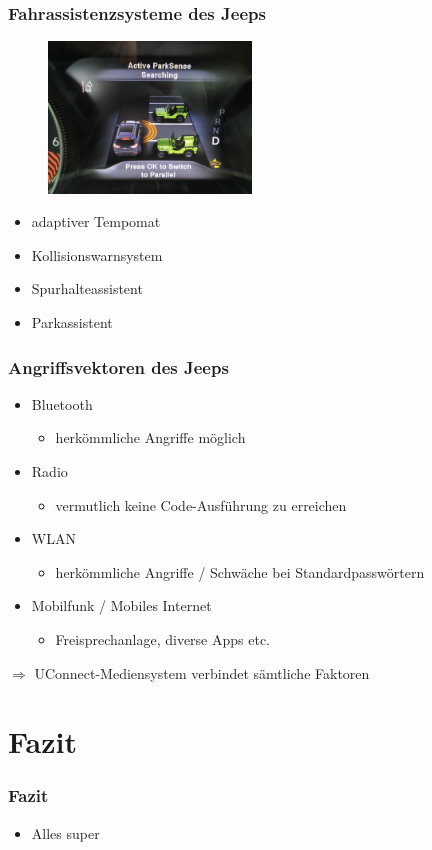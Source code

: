 \documentclass[t]{beamer}
\begin{document}
\begin{frame}
    \frametitle{Fahrassistenzsysteme des Jeeps}
    \begin{figure}
        \includegraphics[width=0.48\textwidth]{pic/jeep_parkass.png}
        \caption{}
    \end{figure}
    \begin{itemize}
        \item adaptiver Tempomat
        \item Kollisionswarnsystem
        \item Spurhalteassistent
        \item Parkassistent
    \end{itemize}
\end{frame}

\begin{frame}
	\frametitle{Angriffsvektoren des Jeeps}
    \begin{itemize}
		\item Bluetooth
        \begin{itemize}
			\item herkömmliche Angriffe möglich
		\end{itemize}

    	\item Radio
        	\begin{itemize}
				\item vermutlich keine Code-Ausführung zu erreichen
			\end{itemize}

        \item WLAN
        	\begin{itemize}
				\item herkömmliche Angriffe / Schwäche bei Standardpasswörtern
			\end{itemize}

        \item Mobilfunk / Mobiles Internet
       		\begin{itemize}
				\item Freisprechanlage, diverse Apps etc.
			\end{itemize}
	\end{itemize}
    $\Rightarrow$ UConnect-Mediensystem verbindet sämtliche Faktoren
\end{frame}

\section{Fazit}
\begin{frame}
	\frametitle{Fazit}
	\begin{itemize}
		\item Alles super
	\end{itemize}
\end{frame}
\end{document}
